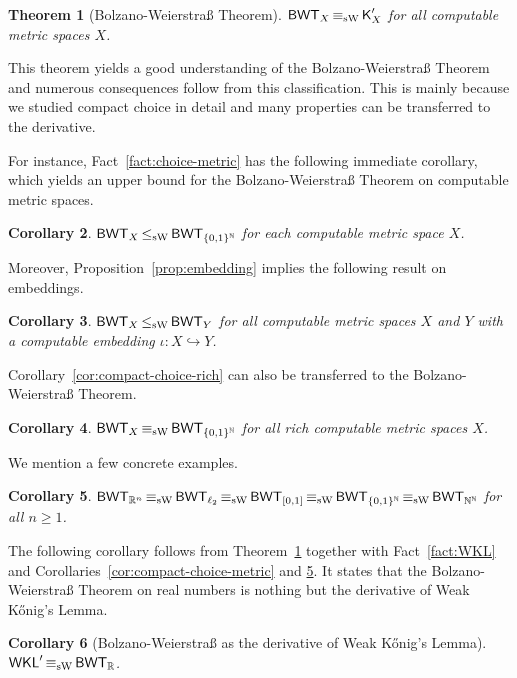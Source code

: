 \documentclass[a4paper]{amsart}
\def\IN{{\mathbb{N}}}
\def\IR{{\mathbb{R}}}
\def\into{\hookrightarrow}
\def\Cantor{{\{0,1\}^\IN}}
\def\Baire{{\IN^\IN}}
\def\ll#1{\ell_{#1}}
\def\WKL{\text{\rm\sffamily WKL}}
\def\BWT{\text{\rm\sffamily BWT}}
\def\K{\text{\rm\sffamily K}}
\def\leqSW{\mathop{\leq_{\mathrm{sW}}}}
\def\equivSW{\mathop{\equiv_{\mathrm{sW}}}}
\newtheorem{theorem}{Theorem}[section]
\newtheorem{corollary}[theorem]{Corollary}
\theoremstyle{definition}
\begin{document}
\begin{theorem}[Bolzano-Weierstra\ss{} Theorem]
\label{thm:BWT}
$\BWT_X\equivSW\K_X'$ for all computable metric spaces $X$.
\end{theorem}

This theorem yields a good understanding of the Bolzano-Weierstra\ss{} Theorem
and numerous consequences follow from this classification. This is mainly
because we studied compact choice in detail and many properties
can be transferred to the derivative.

For instance, Fact~\ref{fact:choice-metric} has the following immediate
corollary, which yields an upper bound for the Bolzano-Weierstra\ss{} Theorem
on computable metric spaces.

\begin{corollary}
\label{cor:BWT-metric}
$\BWT_X\leqSW\BWT_\Cantor$ for each computable metric space $X$.
\end{corollary}

Moreover, Proposition~\ref{prop:embedding} implies the following result on embeddings.

\begin{corollary}
\label{cor:BWT-embedding}
$\BWT_X\leqSW\BWT_Y$ for all computable metric spaces $X$ and $Y$ with a computable
embedding $\iota:X\into Y$.
\end{corollary}

Corollary~\ref{cor:compact-choice-rich} can also be transferred to the 
Bolzano-Weierstra\ss{} Theorem. 

\begin{corollary}
\label{cor:BWT-rich}
$\BWT_X\equivSW\BWT_\Cantor$ for all rich computable metric spaces $X$.
\end{corollary}

We mention a few concrete examples.

\begin{corollary}
\label{cor:perfect-BWT-examples}
$\BWT_{\IR^n}\equivSW\BWT_{\ll{2}}\equivSW\BWT_{[0,1]}\equivSW\BWT_\Cantor\equivSW\BWT_\Baire$ for all $n\geq1$.
\end{corollary}

The following corollary follows from Theorem~\ref{thm:BWT} together with Fact~\ref{fact:WKL}
and Corollaries~\ref{cor:compact-choice-metric} and \ref{cor:perfect-BWT-examples}.
It states that the Bolzano-Weierstra\ss{} Theorem on real
numbers is nothing but the derivative of Weak K\H{o}nig's Lemma.

\begin{corollary}[Bolzano-Weierstra\ss{} as the derivative of Weak K\H{o}nig's Lemma]
\label{cor:jump-WKL}
$\WKL'\equivSW\BWT_\IR$.
\end{corollary}
\end{document}

